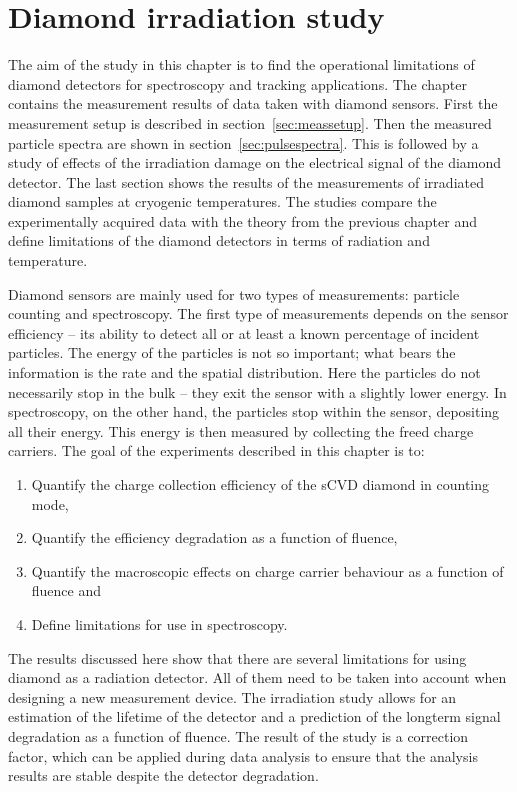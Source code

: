  
\chapter{Diamond irradiation study}%
\label{ch:meas}


The aim of the study in this chapter is to find the operational limitations of diamond detectors for spectroscopy and tracking applications. The chapter contains the measurement results of data taken with diamond sensors. First the measurement setup is described in section~\ref{sec:meassetup}. Then the measured particle spectra are shown in section~\ref{sec:pulsespectra}. This is followed by a study of effects of the irradiation damage on the electrical signal of the diamond detector. The last section shows the results of the measurements of irradiated diamond samples at cryogenic temperatures. The studies compare the experimentally acquired data with the theory from the previous chapter and define limitations of the diamond detectors in terms of radiation and temperature.

Diamond sensors are mainly used for two types of measurements: particle counting and spectroscopy. The first type of measurements depends on the sensor efficiency -- its ability to detect all or at least a known percentage of incident particles. The energy of the particles is not so important; what bears the information is the rate and the spatial distribution. Here the particles do not necessarily stop in the bulk -- they exit the sensor with a slightly lower energy. In spectroscopy, on the other hand, the particles stop within the sensor, depositing all their energy. This energy is then measured by collecting the freed charge carriers. The goal of the experiments described in this chapter is to:
\begin{enumerate}[itemsep=0.1\baselineskip]
\item Quantify the charge collection efficiency of the sCVD diamond in counting mode, 
\item Quantify the efficiency degradation as a function of fluence,
\item Quantify the macroscopic effects on charge carrier behaviour as a function of fluence and 
\item Define limitations for use in spectroscopy.
\end{enumerate}
The results discussed here show that there are several limitations for using diamond as a radiation detector. All of them need to be taken into account when designing a new measurement device. The irradiation study allows for an estimation of the lifetime of the detector and a prediction of the longterm signal degradation as a function of fluence. The result of the study is a correction factor, which can be applied during data analysis to ensure that the analysis results are stable despite the detector degradation.


